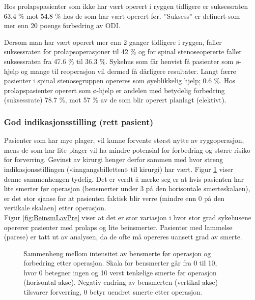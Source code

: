 \documentclass [norsk,a4paper,twoside]{article}\usepackage[]{graphicx}\usepackage[]{color}
\begin{document}
Hos prolapspasienter som ikke har vært operert i ryggen tidligere er 
suksessraten 63.4 \% mot 54.8 \%
      hos de som har vært operert før. 
''Suksess'' er definert som mer enn 20 poengs forbedring av ODI. 

Dersom man har vært operert mer enn 2 ganger tidligere i
ryggen, faller suksessraten for prolapsoperasjoner til 42 \% 
og for spinal stenoseopererte faller suksessraten fra 
47.6 \% til 36.3 \%. 
Sykehus som får henvist få pasienter som ø-hjelp og
mange til reoperasjon vil dermed få dårligere resultater. 
Langt færre pasienter i spinal stenosegruppen opereres som øyeblikkelig hjelp; 0.6 \%.
Hos prolapspasienter operert som ø-hjelp er andelen med betydelig forbedring 
(suksessrate)  78.7 \%, mot 57 \% av de som blir 
operert planlagt (elektivt). 




\subsubsection{God indikasjonsstilling (rett pasient)}


      
      Pasienter som har mye plager, vil kunne forvente størst nytte av ryggoperasjon,
mens de som har lite plager vil ha mindre potensial for forbedring og større risiko
for forverring. Gevinst av kirurgi henger derfor sammen med hvor streng
indikasjonsstillingen («inngangsbilletten» til kirurgi) har vært. Figur \ref{fig:BeinsmEndrPre} viser denne
sammenhengen tydelig. Det er verdt å merke seg er at hvis pasienten har lite smerter før
operasjon (bensmerter under 3 på den horisontale smerteskalaen), er det stor
sjanse for at pasienten faktisk blir verre (mindre enn 0 på den vertikale skalaen) etter
operasjon. \\
Figur \ref{fig:BeinsmLavPre} viser at det er stor variasjon i hvor stor grad sykehusene opererer
pasienter med prolaps og lite beinsmerter. Pasienter med lammelse (parese) er tatt
ut av analysen, da de ofte må opereres uansett grad av smerte.



\begin{figure}[ht]
\caption{\label{fig:BeinsmEndrPre}  Sammenheng mellom intensitet av bensmerte før operasjon og
      forbedring etter operasjon. Skala for bensmerter går fra 0 til 10, hvor 0 betegner
      ingen og 10 verst tenkelige smerte før operasjon (horisontal akse). Negativ endring
      av bensmerten (vertikal akse) tilsvarer forverring, 0 betyr uendret smerte etter
      operasjon.}
\end{figure}
\end{document}
